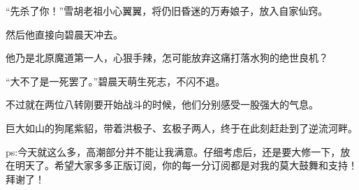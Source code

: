 \begin{this_body}
“先杀了你！”雪胡老祖小心翼翼，将仍旧昏迷的万寿娘子，放入自家仙窍。

然后他直接向碧晨天冲去。

他乃是北原魔道第一人，心狠手辣，怎可能放弃这痛打落水狗的绝世良机？

“大不了是一死罢了。”碧晨天萌生死志，不闪不退。

不过就在两位八转刚要开始战斗的时候，他们分别感受一股强大的气息。

巨大如山的狗尾紫貂，带着洪极子、玄极子两人，终于在此刻赶赴到了逆流河畔。

ps:今天就这么多，高潮部分并不能让我满意。仔细考虑后，还是要大修一下，放在明天了。希望大家多多正版订阅，你的每一分订阅都是对我的莫大鼓舞和支持！拜谢了！

\end{this_body}

